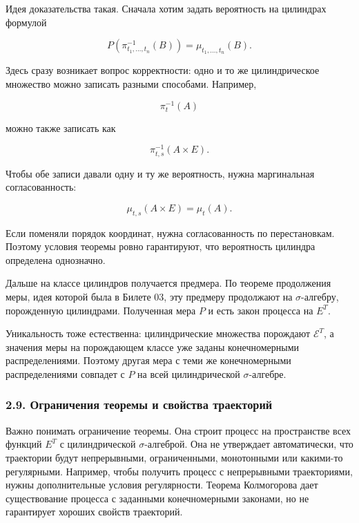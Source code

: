 \documentclass[
  11pt,
  a4paper,
]{article}
\begin{document}
Идея доказательства такая. Сначала хотим задать вероятность на цилиндрах
формулой

\[
P\left(\pi_{t_1,\ldots,t_n}^{-1}(B)\right)
=
\mu_{t_1,\ldots,t_n}(B).
\]

Здесь сразу возникает вопрос корректности: одно и то же цилиндрическое
множество можно записать разными способами. Например,

\[
\pi_t^{-1}(A)
\]

можно также записать как

\[
\pi_{t,s}^{-1}(A\times E).
\]

Чтобы обе записи давали одну и ту же вероятность, нужна маргинальная
согласованность:

\[
\mu_{t,s}(A\times E)=\mu_t(A).
\]

Если поменяли порядок координат, нужна согласованность по перестановкам.
Поэтому условия теоремы ровно гарантируют, что вероятность цилиндра
определена однозначно.

Дальше на классе цилиндров получается предмера. По теореме продолжения
меры, идея которой была в Билете 03, эту предмеру продолжают на
\(\sigma\)-алгебру, порожденную цилиндрами. Полученная мера \(P\) и есть
закон процесса на \(E^T\).

Уникальность тоже естественна: цилиндрические множества порождают
\(\mathcal E^T\), а значения меры на порождающем классе уже заданы
конечномерными распределениями. Поэтому другая мера с теми же
конечномерными распределениями совпадет с \(P\) на всей цилиндрической
\(\sigma\)-алгебре.

\subsubsection{2.9. Ограничения теоремы и свойства
траекторий}\label{ux43eux433ux440ux430ux43dux438ux447ux435ux43dux438ux44f-ux442ux435ux43eux440ux435ux43cux44b-ux438-ux441ux432ux43eux439ux441ux442ux432ux430-ux442ux440ux430ux435ux43aux442ux43eux440ux438ux439}

Важно понимать ограничение теоремы. Она строит процесс на пространстве
всех функций \(E^T\) с цилиндрической \(\sigma\)-алгеброй. Она не
утверждает автоматически, что траектории будут непрерывными,
ограниченными, монотонными или какими-то регулярными. Например, чтобы
получить процесс с непрерывными траекториями, нужны дополнительные
условия регулярности. Теорема Колмогорова дает существование процесса с
заданными конечномерными законами, но не гарантирует хороших свойств
траекторий.
\end{document}
